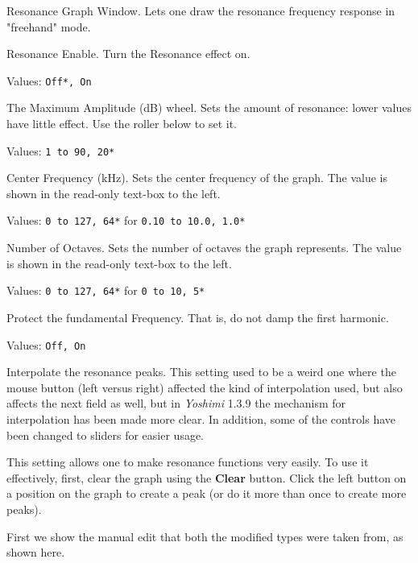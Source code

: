    \setcounter{ItemCounter}{0}      %

   Resonance Graph Window.
   Lets one draw the resonance frequency response in "freehand" mode.

   Resonance Enable.
   Turn the Resonance effect on.

   Values: \texttt{Off*, On}

   The Maximum Amplitude (dB) wheel.
   Sets the amount of resonance: lower values have little effect. Use the
   roller below to set it.

   Values: \texttt{1 to 90, 20*}

   Center Frequency (kHz).
   Sets the center frequency of the graph.
   The value is shown in the read-only text-box to the left.

   Values: \texttt{0 to 127, 64*} for \texttt{0.10 to 10.0, 1.0*}

   Number of Octaves.
   Sets the number of octaves the graph represents.
   The value is shown in the read-only text-box to the left.

   Values: \texttt{0 to 127, 64*} for \texttt{0 to 10, 5*}

   Protect the fundamental Frequency.
   That is, do not damp the first harmonic.

   Values: \texttt{Off, On}

   Interpolate the resonance peaks.
   This setting used to be a weird one where the mouse button (left versus
   right) affected the kind of interpolation used,
   but also affects the next field as well, but in \textsl{Yoshimi} 1.3.9 the
   mechanism for interpolation has been made more clear.
   In addition, some of the controls have been changed to sliders for easier
   usage.

   This setting allows one to make resonance functions very easily.  To use
   it effectively, first, clear the graph using the \textbf{Clear} button.
   Click the left button on a position on the graph to create a peak (or do it
   more than once to create more peaks).

   First we show the manual edit that both the modified types were taken from, as shown here.


